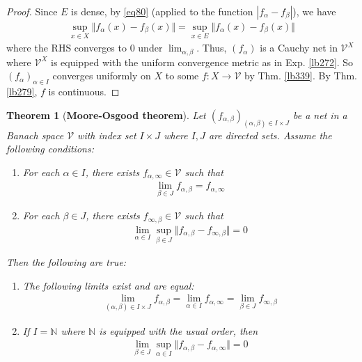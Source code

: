 \documentclass[12pt,b5paper,notitlepage]{article}
\theoremstyle{definition}
\theoremstyle{plain}
\newtheorem{thm}[df]{Theorem}
\newcommand{\mc}{\mathcal}
\newcommand{\Nbb}{\mathbb N}
\numberwithin{equation}{section}
\begin{document}
\begin{proof}
Since $E$ is dense, by \eqref{eq80} (applied to the function $|f_\alpha-f_\beta|$), we have
\begin{align*}
\sup_{x\in X}\Vert f_\alpha(x)-f_\beta(x)\Vert=\sup_{x\in E}\Vert f_\alpha(x)-f_\beta(x)\Vert
\end{align*}
where the RHS converges to $0$ under $\lim_{\alpha,\beta}$. Thus, $(f_\alpha)$ is a Cauchy net in $\mc V^X$ where $\mc V^X$ is equipped with the uniform convergence metric as in Exp. \ref{lb272}. So $(f_\alpha)_{\alpha\in I}$ converges uniformly on $X$ to some $f:X\rightarrow\mc V$ by Thm. \ref{lb339}. By Thm. \ref{lb279}, $f$ is continuous.
\end{proof}




\begin{thm}[\textbf{Moore-Osgood theorem}]\label{lb289}  
Let $(f_{\alpha,\beta})_{(\alpha,\beta)\in I\times J}$ be a net in a Banach space $\mc V$ with index set $I\times J$ where $I,J$ are directed sets. Assume the following conditions:
\begin{enumerate}[label=(\arabic*)]
\item For each $\alpha\in I$, there exists $f_{\alpha,\infty}\in\mc V$ such that 
\begin{align}
\lim_{\beta\in J} f_{\alpha,\beta}=f_{\alpha,\infty}
\end{align}
\item For each $\beta\in J$, there exists $f_{\infty,\beta}\in\mc V$ such that
\begin{align}
\lim_{\alpha\in I}\sup_{\beta\in J}\Vert f_{\alpha,\beta}-f_{\infty,\beta}\Vert=0
\end{align}
\end{enumerate}
Then the following are true:
\begin{enumerate}
\item The following limits exist and are equal:
\begin{align}
\lim_{(\alpha,\beta)\in I\times J}f_{\alpha,\beta}=\lim_{\alpha\in I}f_{\alpha,\infty}=\lim_{\beta\in J}f_{\infty,\beta}
\end{align}
\item If $I=\Nbb$ where $\Nbb$ is equipped with the usual order, then
\begin{align}\label{eq89}
\lim_{\beta\in J}\sup_{\alpha\in I}\Vert f_{\alpha,\beta}-f_{\alpha,\infty}\Vert=0
\end{align}
\end{enumerate}
\end{thm}
\end{document}
